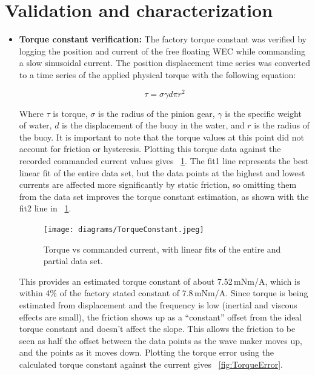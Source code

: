 \documentclass[11pt, letterpaper]{article}
\begin{document}
\section{Validation and characterization}

\begin{itemize}
\item \textbf{Torque constant verification:} 
The factory torque constant was verified by logging the position and current of the free floating WEC while commanding a slow sinusoidal current.
The position displacement time series was converted to a time series of the applied physical torque with the following equation:

\begin{equation}
  \tau = \sigma \gamma d \pi r^2
\end{equation}

Where $\tau$ is torque, $\sigma$ is the radius of the pinion gear, $\gamma$ is the specific weight of water, $d$ is the displacement of the buoy in the water, and $r$ is the radius of the buoy.
It is important to note that the torque values at this point did not account for friction or hysteresis.
Plotting this torque data against the recorded commanded current values gives  \figurename~\ref{fig:TorqueConstant}.
The fit1 line represents the best linear fit of the entire data set, but the data points at the highest and lowest currents are affected more significantly by static friction, so omitting them from the data set improves the torque constant estimation, as shown with the fit2 line in \figurename~\ref{fig:TorqueConstant}.
\begin{figure}[tb]
  \centering
  \texttt{[image: diagrams/TorqueConstant.jpeg]}
  \caption{Torque vs commanded current, with linear fits of the entire and partial data set.}
  \label{fig:TorqueConstant}
\end{figure}
This provides an estimated torque constant of about 7.52\,mNm/A, which is within 4\% of the factory stated constant of 7.8\,mNm/A.
\linebreak
Since torque is being estimated from displacement and the frequency is low (inertial and viscous effects are small), the friction shows up as a ``constant'' offset from the ideal torque constant and doesn't affect the slope.
This allows the friction to be seen as half the offset between the data points as the wave maker moves up, and the points as it moves down. 
Plotting the torque error using the calculated torque constant against the current gives \figurename~\ref{fig:TorqueError}.


\end{itemize}
\end{document}
